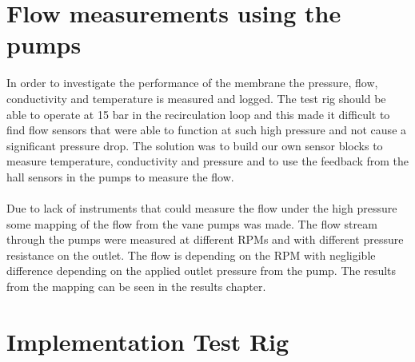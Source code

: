 \section{Flow measurements using the pumps}
In order to investigate the performance of the membrane the pressure, flow, conductivity and temperature is measured and logged. The test rig should be able to operate at 15 bar in the recirculation loop and this made it difficult to find flow sensors that were able to function at such high pressure and not cause a significant pressure drop. The solution was to build our own sensor blocks to measure temperature, conductivity and pressure and to use the feedback from the hall sensors in the pumps to measure the flow. \\
\\
Due to lack of instruments that could measure the flow under the high pressure some mapping of the flow from the vane pumps was made. The flow stream through the pumps were measured at different RPMs and with different pressure resistance on the outlet. The flow is depending on the RPM with negligible difference depending on the applied outlet pressure from the pump. The results from the mapping can be seen in the results chapter. 
\newpage
\section{Implementation Test Rig}
